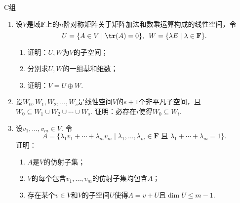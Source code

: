 \centerline{\heiti C组}
\begin{enumerate}
    \item 设$V$是域$\mathbf{F}$上的$n$阶对称矩阵关于矩阵加法和数乘运算构成的线性空间，令
          \[U=\{A\in V \mid \tr(A)=0\},\enspace W=\{\lambda E \mid \lambda\in\mathbf{F}\}.\]
          \begin{enumerate}
              \item 证明：$U,W$为$V$的子空间；

              \item 分别求$U,W$的一组基和维数；

              \item 证明：$V=U\oplus W$.
          \end{enumerate}

    \item 设$W_0,W_1,W_2,\ldots,W_s$是线性空间$V$的$s+1$个非平凡子空间，且$W_0 \subseteq W_1 \cup W_2 \cup \cdots \cup W_s$. 证明：必存在$i$使得$W_0\subseteq W_i$.

    \item 设$v_1,\ldots,v_m\in V$. 令
    \[A=\{\lambda_1v_1+\cdots+\lambda_mv_m \mid \lambda_1,\ldots,\lambda_m\in\mathbf{F}\text{~且~}\lambda_1+\cdots+\lambda_m=1\}.\]
    证明：
    \begin{enumerate}
        \item $A$是$V$的仿射子集；

        \item $V$的每个包含$v_1,\ldots,v_m$的仿射子集均包含$A$；

        \item 存在某个$v\in V$和$V$的子空间$U$使得$A=v+U$且$\dim U\leqslant m-1$.
    \end{enumerate}
\end{enumerate}
